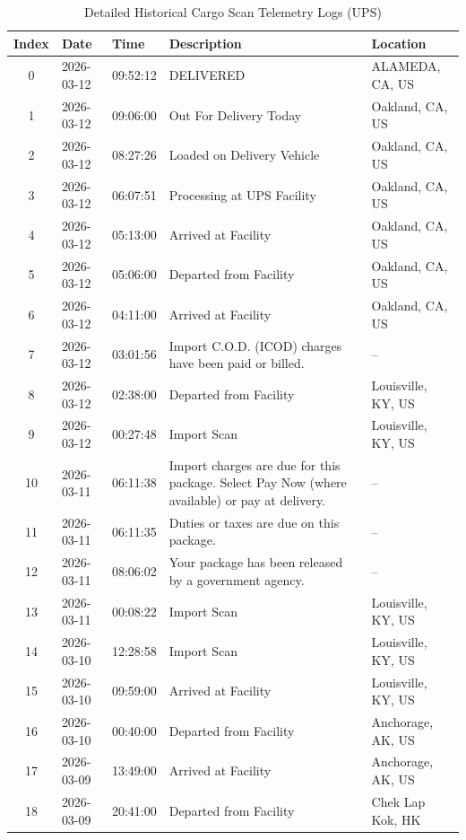 \begin{table}[H]
\centering
\caption{Detailed Historical Cargo Scan Telemetry Logs (UPS)}
\label{tab:ups-telemetry-log}
\renewcommand{\arraystretch}{1} 
\begin{tabularx}{\textwidth}{c l l X l}
\toprule
\textbf{Index} & \textbf{Date} & \textbf{Time} & \textbf{Description} & \textbf{Location} \\
\midrule
0  & 2026-03-12 & 09:52:12 & DELIVERED & ALAMEDA, CA, US \\
1  & 2026-03-12 & 09:06:00 & Out For Delivery Today & Oakland, CA, US \\
2  & 2026-03-12 & 08:27:26 & Loaded on Delivery Vehicle & Oakland, CA, US \\
3  & 2026-03-12 & 06:07:51 & Processing at UPS Facility & Oakland, CA, US \\
4  & 2026-03-12 & 05:13:00 & Arrived at Facility & Oakland, CA, US \\
5  & 2026-03-12 & 05:06:00 & Departed from Facility & Oakland, CA, US \\
6  & 2026-03-12 & 04:11:00 & Arrived at Facility & Oakland, CA, US \\
7  & 2026-03-12 & 03:01:56 & Import C.O.D. (ICOD) charges have been paid or billed. & -- \\
8  & 2026-03-12 & 02:38:00 & Departed from Facility & Louisville, KY, US \\
9  & 2026-03-12 & 00:27:48 & Import Scan & Louisville, KY, US \\
10 & 2026-03-11 & 06:11:38 & Import charges are due for this package. Select Pay Now (where available) or pay at delivery. & -- \\
11 & 2026-03-11 & 06:11:35 & Duties or taxes are due on this package. & -- \\
12 & 2026-03-11 & 08:06:02 & Your package has been released by a government agency. & -- \\
13 & 2026-03-11 & 00:08:22 & Import Scan & Louisville, KY, US \\
14 & 2026-03-10 & 12:28:58 & Import Scan & Louisville, KY, US \\
15 & 2026-03-10 & 09:59:00 & Arrived at Facility & Louisville, KY, US \\
16 & 2026-03-10 & 00:40:00 & Departed from Facility & Anchorage, AK, US \\
17 & 2026-03-09 & 13:49:00 & Arrived at Facility & Anchorage, AK, US \\
18 & 2026-03-09 & 20:41:00 & Departed from Facility & Chek Lap Kok, HK \\

\end{tabularx}
\end{table}
